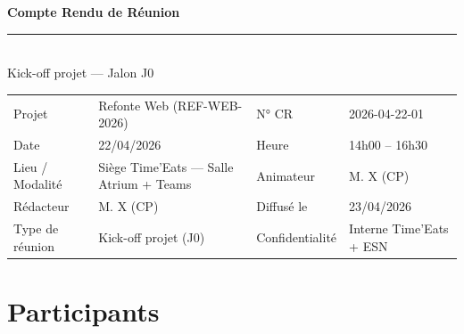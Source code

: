 \documentclass[11pt,a4paper,oneside]{report}
\begin{document}
\small

\begin{center}
{\LARGE\bfseries\color{cnNavy} Compte Rendu de Réunion}\\[4pt]
\textcolor{cnOrange}{\rule{10cm}{1pt}}\\[4pt]
{\large\color{cnSlate} Kick-off projet --- Jalon J0}
\end{center}

\vspace{6pt}
\renewcommand{\arraystretch}{1.4}
\begin{tabularx}{\textwidth}{L{3.5cm} Y L{3.5cm} Y}
\toprule
{} &  &  &  \\
\midrule
Projet          & Refonte Web (REF-WEB-2026) & N° CR        & 2026-04-22-01 \\
Date            & 22/04/2026                  & Heure        & 14h00 -- 16h30 \\
Lieu / Modalité & Siège Time'Eats --- Salle Atrium + Teams & Animateur    & M. X (CP) \\
Rédacteur       & M. X (CP)              & Diffusé le   & 23/04/2026 \\
Type de réunion & Kick-off projet (J0)        & Confidentialité & Interne Time'Eats + ESN \\
\bottomrule
\end{tabularx}

\section*{Participants}
\end{document}
